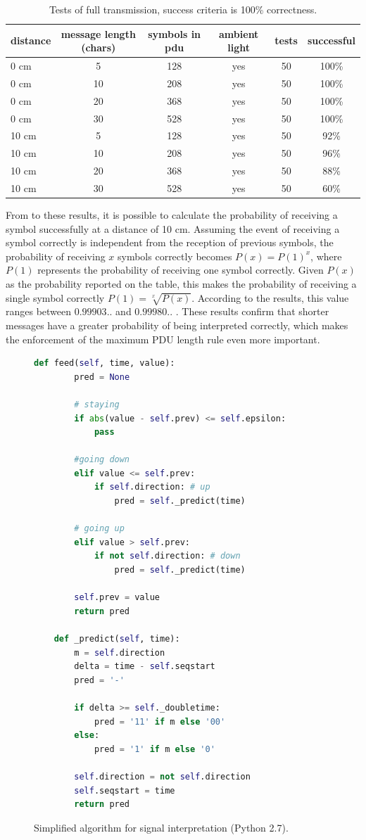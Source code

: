 
\begin{table}[hbt]
\centering
  \begin{tabular}{l c c c c c}
    distance & message length (chars) & symbols in pdu &  ambient light & tests & successful \\
    \hline
   0 cm & 5 & 128 & yes & 50 & 100\% \\
   0 cm & 10 & 208 & yes & 50 & 100\% \\
   0 cm & 20 & 368 & yes & 50 & 100\% \\
   0 cm & 30 & 528 & yes & 50 & 100\% \\
   10 cm & 5 & 128 & yes & 50 & 92\% \\
   10 cm & 10 & 208 & yes & 50 & 96\% \\
   10 cm & 20 & 368 & yes & 50 & 88\% \\
   10 cm & 30 & 528 & yes & 50 & 60\% \\
  \end{tabular}
  \caption{Tests of full transmission, success criteria is 100\% correctness.}
  \label{tab:txresults}
\end{table}

From to these results, it is possible to calculate the probability of receiving a symbol successfully at a distance of 10 cm.
Assuming the event of receiving a symbol correctly is independent from the reception of previous symbols, the probability of receiving $x$ symbols correctly becomes $P(x) = P(1)^x$, where $P(1)$ represents the probability of receiving one symbol correctly. 
Given $P(x)$ as the probability reported on the table, this makes the probability of receiving a single symbol correctly $P(1) = \sqrt[x]{P(x)}$.
According to the results, this value ranges between $0.99903..$ and $0.99980..$ .
These results confirm that shorter messages have a greater probability of being interpreted correctly, which makes the enforcement of the maximum PDU length rule even more important.

\begin{figure}
\centering
\begin{lstlisting}[language=Python, frame={}]
	def feed(self, time, value):
		pred = None
		
		# staying
		if abs(value - self.prev) <= self.epsilon:
			pass

		#going down
		elif value <= self.prev: 
			if self.direction: # up	
				pred = self._predict(time)

		# going up
		elif value > self.prev: 
			if not self.direction: # down
				pred = self._predict(time)

		self.prev = value
		return pred
		
	def _predict(self, time):
		m = self.direction
		delta = time - self.seqstart
		pred = '-'
		
		if delta >= self._doubletime:
			pred = '11' if m else '00'
		else:
			pred = '1' if m else '0'

		self.direction = not self.direction
		self.seqstart = time
		return pred
\end{lstlisting}
\caption{Simplified algorithm for signal interpretation (Python 2.7).}
\label{code}
\end{figure}